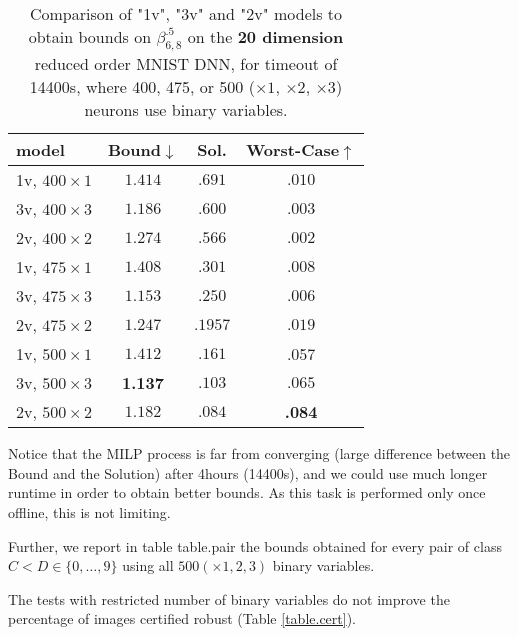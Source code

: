\begin{table}[h!]
	\centering
	\begin{tabular}{||l||c|c|c||}\hline\hline
		model &        Bound$\downarrow$ &  Sol. &      Worst-Case$\uparrow$ \\\hline \hline
1v, $400 \times 1$ & $1.414$ &  $.691$ & $.010$ \\\hline 
3v, $400 \times 3$ & $1.186$ & $.600$ & $.003$ \\\hline 
2v, $400 \times 2$ & $1.274$ & $.566$ & $.002$ \\\hline\hline
	 
1v, $475 \times 1$ &  $1.408$ & $.301$ & $.008$  \\\hline 
3v, $475 \times 3$ &  $1.153$ & $.250$ & $.006$ \\ \hline 
2v, $475 \times 2$ &  $1.247$ & $.1957$ & $.019$ \\\hline\hline

1v, $500 \times 1$ & $1.412$ & $.161$ & .057 \\\hline 
3v, $500 \times 3$ & {\bf 1.137} & $.103$ & $.065$\\\hline 
2v, $500 \times 2$ &  $1.182$ & $.084$& {\bf .084}  \\\hline\hline
	 
	\end{tabular}
	\caption{Comparison of "1v", "3v" and "2v" models 
	to obtain bounds on $\beta^{.5}_{6,8}$ on the {\bf 20 dimension} reduced order MNIST DNN, for timeout of 14400s, 
	where 400, 475,  or 500 ($\times 1$, $\times 2$, $\times 3$) neurons use binary variables.}
	\label{table.reduced}
\end{table}


Notice that the MILP process is far from converging (large difference between the Bound and the Solution) after 4hours (14400s), and we could use much longer 
runtime in order to obtain better bounds. As this task is performed only once offline, this is not limiting.

Further, we report in table {table.pair} the bounds obtained for every pair of class $C < D \in \{0, \ldots, 9\}$
using all $500 (\times 1,2,3) $ binary variables.





The tests with restricted number of binary variables do not improve the percentage of images certified robust (Table \ref{table.cert}). 

